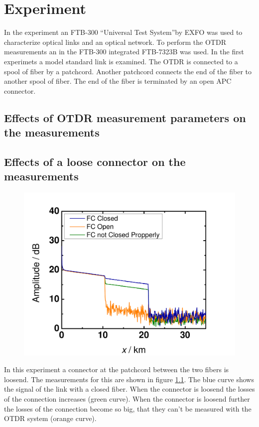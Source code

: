 \chapter{Experiment}
\label{ch:exp}
In the experiment an FTB-300 ``Universal Test System''by EXFO was used to characterize optical links and an optical network. To perform the OTDR measurements an in the FTB-300 integrated FTB-7323B was used. In the first experimets a model standard link is examined. The OTDR is connected to a spool of fiber by a patchcord. Another patchcord connects the end of the fiber to another spool of fiber. The end of the fiber is terminated by an open APC connector. 

\section{Effects of OTDR measurement parameters on the measurements}


\section{Effects of a loose connector on the measurements}

\begin{figure}%
\centering
\includegraphics[width=.8\columnwidth]{grafiken/Connector.pdf}%
\caption{}%
\label{fig:connector}%
\end{figure}

In this experiment a connector at the patchcord between the two fibers is loosend. The measurements for this are shown in figure \ref{fig:connector}. The blue curve shows the signal of the link with a closed fiber. When the connector is loosend the losses of the connection increases (green curve). When the connector is loosend further the losses of the connection become so big, that they can't be measured with the OTDR system (orange curve). 

